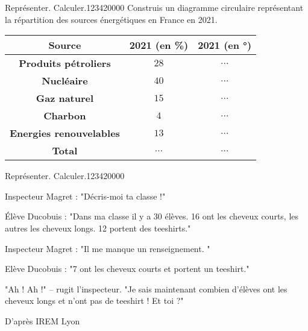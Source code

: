 \begin{pageParcourst}
\begin{ExoCt}{Représenter. Calculer.}{1234}{2}{0}{0}{0}{0}
 Construis un diagramme circulaire représentant la répartition des sources énergétiques en France en 2021.

 \begin{minipage}{0.6\linewidth}

\begin{center}
\begin{tabular}{|c|c|c|}\hline
\textbf{Source} & \textbf{2021} (en \%)& \textbf{2021} (en °)\\\hline
\textbf{Produits pétroliers} &	$28$ &$\ldots$ \\\hline
\textbf{Nucléaire} &	$40$ &$\ldots$ \\\hline
\textbf{Gaz naturel} &	$15$ &$\ldots$ \\\hline
\textbf{Charbon} &	$4$ &$\ldots$ \\\hline
\textbf{Energies renouvelables} &  $13$ & $\ldots$ \\\hline
\textbf{Total} &   $\ldots$ &$\ldots$  \\\hline
\end{tabular}
\end{center}
\end{minipage}
 \begin{minipage}{0.4\linewidth}
 

 \end{minipage} 
  \end{ExoCt}



\begin{ExoCt}{Représenter. Calculer.}{1234}{2}{0}{0}{0}{0}


Inspecteur Magret : "Décris-moi ta classe !"

Élève Ducobuis : "Dans ma classe il y a 30 élèves. 16 ont les cheveux courts, les autres les cheveux longs. 12 portent 
des teeshirts."

Inspecteur Magret : "Il me manque un renseignement. "

Elève Ducobuis : "7 ont les cheveux courts et portent un teeshirt."

"Ah ! Ah !" – rugit l’inspecteur. "Je sais maintenant combien d’élèves ont les cheveux longs et n’ont 
pas de teeshirt ! Et toi ?"


\hfill{\tiny D'après IREM Lyon}
  \end{ExoCt}
 

\end{pageParcourst}

